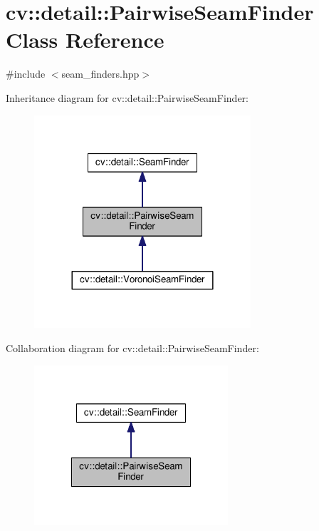 \hypertarget{classcv_1_1detail_1_1PairwiseSeamFinder}{\section{cv\-:\-:detail\-:\-:Pairwise\-Seam\-Finder Class Reference}
\label{classcv_1_1detail_1_1PairwiseSeamFinder}
}


{\ttfamily \#include $<$seam\-\_\-finders.\-hpp$>$}



Inheritance diagram for cv\-:\-:detail\-:\-:Pairwise\-Seam\-Finder\-:\nopagebreak
\begin{figure}[H]
\begin{center}
\leavevmode
\includegraphics[width=228pt]{classcv_1_1detail_1_1PairwiseSeamFinder__inherit__graph}
\end{center}
\end{figure}


Collaboration diagram for cv\-:\-:detail\-:\-:Pairwise\-Seam\-Finder\-:\nopagebreak
\begin{figure}[H]
\begin{center}
\leavevmode
\includegraphics[width=204pt]{classcv_1_1detail_1_1PairwiseSeamFinder__coll__graph}
\end{center}
\end{figure}
